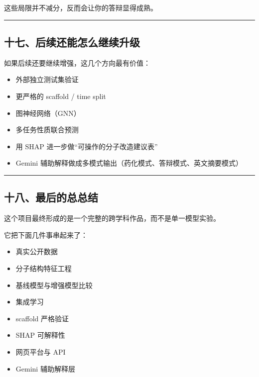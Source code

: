 \documentclass[
  ,
]{ctexart}
\providecommand{\tightlist}{%
  \setlength{\itemsep}{0pt}\setlength{\parskip}{0pt}}
\begin{document}
这些局限并不减分，反而会让你的答辩显得成熟。

\begin{center}\rule{0.5\linewidth}{0.5pt}\end{center}

\hypertarget{ux5341ux4e03ux540eux7eedux8fd8ux80fdux600eux4e48ux7ee7ux7eedux5347ux7ea7}{%
\subsection{十七、后续还能怎么继续升级}\label{ux5341ux4e03ux540eux7eedux8fd8ux80fdux600eux4e48ux7ee7ux7eedux5347ux7ea7}}

如果后续还要继续增强，这几个方向最有价值：

\begin{itemize}
\tightlist
\item
  外部独立测试集验证
\item
  更严格的 scaffold / time split
\item
  图神经网络（GNN）
\item
  多任务性质联合预测
\item
  用 SHAP 进一步做``可操作的分子改造建议表''
\item
  Gemini 辅助解释做成多模式输出（药化模式、答辩模式、英文摘要模式）
\end{itemize}

\begin{center}\rule{0.5\linewidth}{0.5pt}\end{center}

\hypertarget{ux5341ux516bux6700ux540eux7684ux603bux603bux7ed3}{%
\subsection{十八、最后的总总结}\label{ux5341ux516bux6700ux540eux7684ux603bux603bux7ed3}}

这个项目最终形成的是一个完整的跨学科作品，而不是单一模型实验。

它把下面几件事串起来了：

\begin{itemize}
\tightlist
\item
  真实公开数据
\item
  分子结构特征工程
\item
  基线模型与增强模型比较
\item
  集成学习
\item
  scaffold 严格验证
\item
  SHAP 可解释性
\item
  网页平台与 API
\item
  Gemini 辅助解释层
\end{itemize}
\end{document}
